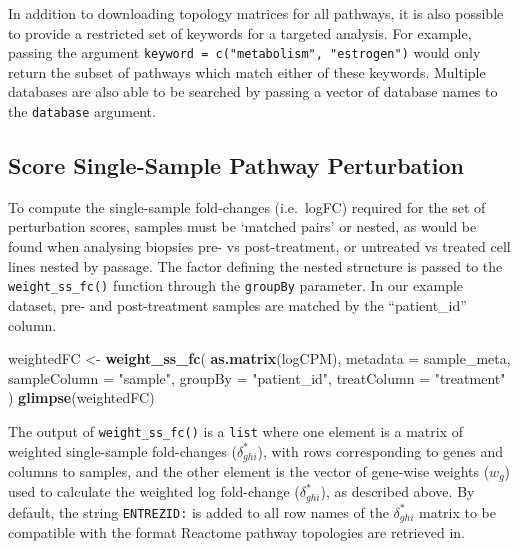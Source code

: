 \documentclass[9pt,a4paper,]{extarticle}
\newenvironment{Shaded}{\begin{snugshade}}{\end{snugshade}}
\newcommand{\AttributeTok}[1]{\textcolor[rgb]{0.13,0.29,0.53}{#1}}
\newcommand{\FunctionTok}[1]{\textcolor[rgb]{0.13,0.29,0.53}{\textbf{#1}}}
\newcommand{\NormalTok}[1]{#1}
\newcommand{\OtherTok}[1]{\textcolor[rgb]{0.56,0.35,0.01}{#1}}
\newcommand{\StringTok}[1]{\textcolor[rgb]{0.31,0.60,0.02}{#1}}
\begin{document}
In addition to downloading topology matrices for all pathways, it is also possible to provide a restricted set of keywords for a targeted analysis.
For example, passing the argument \texttt{keyword\ =\ c("metabolism",\ "estrogen")} would only return the subset of pathways which match either of these keywords.
Multiple databases are also able to be searched by passing a vector of database names to the \texttt{database} argument.

\hypertarget{score-single-sample-pathway-perturbation}{%
\subsection{Score Single-Sample Pathway Perturbation}\label{score-single-sample-pathway-perturbation}}

To compute the single-sample fold-changes (i.e.~logFC) required for the set of perturbation scores, samples must be `matched pairs' or nested, as would be found when analysing biopsies pre- vs post-treatment, or untreated vs treated cell lines nested by passage.
The factor defining the nested structure is passed to the \texttt{weight\_ss\_fc()} function through the \texttt{groupBy} parameter.
In our example dataset, pre- and post-treatment samples are matched by the ``patient\_id'' column.

\begin{Shaded}
\begin{Highlighting}[]
\NormalTok{weightedFC }\OtherTok{\textless{}{-}} \FunctionTok{weight\_ss\_fc}\NormalTok{(}
  \FunctionTok{as.matrix}\NormalTok{(logCPM), }\AttributeTok{metadata =}\NormalTok{ sample\_meta,}
  \AttributeTok{sampleColumn =} \StringTok{"sample"}\NormalTok{, }\AttributeTok{groupBy =} \StringTok{"patient\_id"}\NormalTok{, }\AttributeTok{treatColumn =} \StringTok{"treatment"}
\NormalTok{)}
\FunctionTok{glimpse}\NormalTok{(weightedFC)}
\end{Highlighting}
\end{Shaded}

The output of \texttt{weight\_ss\_fc()} is a \texttt{list} where one element is a matrix of weighted single-sample fold-changes (\(\delta_{ghi}^*\)), with rows corresponding to genes and columns to samples, and the other element is the vector of gene-wise weights (\(w_g\)) used to calculate the weighted log fold-change (\(\delta_{ghi}^*\)), as described above.
By default, the string \texttt{ENTREZID:} is added to all row names of the \(\delta_{ghi}^*\) matrix to be compatible with the format Reactome pathway topologies are retrieved in.
\end{document}
